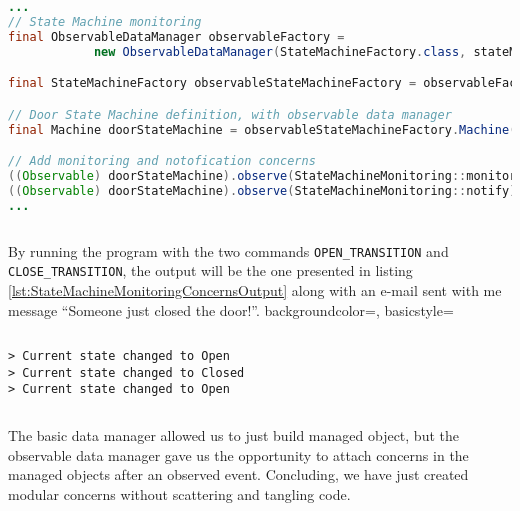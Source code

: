 \begin{sourcecode} [H]
	\begin{lstlisting}[language=Java, escapechar=|]
...
// State Machine monitoring
final ObservableDataManager observableFactory = 
			new ObservableDataManager(StateMachineFactory.class, stateMachineSchema);

final StateMachineFactory observableStateMachineFactory = observableFactory.make();

// Door State Machine definition, with observable data manager
final Machine doorStateMachine = observableStateMachineFactory.Machine();

// Add monitoring and notofication concerns
((Observable) doorStateMachine).observe(StateMachineMonitoring::monitor); |\label{line:state_machine_monitor}|
((Observable) doorStateMachine).observe(StateMachineMonitoring::notify);  |\label{line:state_machine_notify}|
...
	\end{lstlisting}
	\caption{Door state machine with concerns}
	\label{lst:StateMachineMonitoringConcerns}
\end{sourcecode}

By running the program with the two commands \texttt{OPEN\_TRANSITION} and \texttt{CLOSE\_TRANSITION}, the output will be the one presented in listing \ref{lst:StateMachineMonitoringConcernsOutput} along with an e-mail sent with me message ``Someone just closed the door!''.
 {
    backgroundcolor=\color{white},
    basicstyle=\scriptsize\color{black}\ttfamily
}

\begin{sourcecode} [H]
	\lstset{numbers=none}
	\begin{lstlisting}[style=Bash]
> Current state changed to Open
> Current state changed to Closed
> Current state changed to Open
	\end{lstlisting}
	\caption{Door state machine with concerns: output}
	\label{lst:StateMachineMonitoringConcernsOutput}
\end{sourcecode}

The basic data manager allowed us to just build managed object, but the observable data manager gave us the opportunity to attach concerns in the managed objects after an observed event.
Concluding, we have just created modular concerns without scattering and tangling code.
